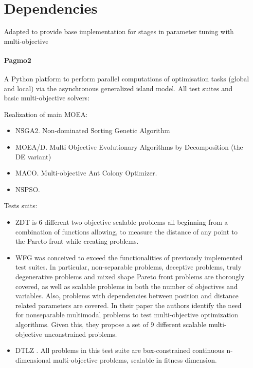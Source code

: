 \section{Dependencies}
    Adapted to provide base implementation for stages in parameter tuning with multi-objective

    \paragraph{Pagmo2} 
        A Python platform \cite{francesco_biscani_2019} to perform parallel computations of optimisation tasks (global and local) via the asynchronous generalized island model.
        All test suites and basic multi-objective solvers:

        Realization of main MOEA:
        \begin{itemize}
            \item NSGA2. Non-dominated Sorting Genetic Algorithm
            \item MOEA/D. Multi Objective Evolutionary Algorithms by Decomposition (the DE variant)
            \item MACO. Multi-objective Ant Colony Optimizer.
            \item NSPSO. 
        \end{itemize}

        Tests suits:
        \begin{itemize}
            \item ZDT \cite{ZitzlerDT00} is 6 different two-objective scalable problems all beginning from a combination of functions allowing, to measure the distance of any point to the Pareto front while creating problems.
            \item WFG \cite{WFGref} was conceived to exceed the functionalities of previously implemented test suites. In particular, non-separable problems, deceptive problems, truly degenerative problems and mixed shape Pareto front problems are thorougly covered, as well as scalable problems in both the number of objectives and variables. Also, problems with dependencies between position and distance related parameters are covered. In their paper the authors identify the need for nonseparable multimodal problems to test multi-objective optimization algorithms. Given this, they propose a set of 9 different scalable multi-objective unconstrained problems.
            \item DTLZ \cite{DebTLZ05}. All problems in this test suite are box-constrained continuous n-dimensional multi-objective problems, scalable in fitness dimension.
        \end{itemize}


